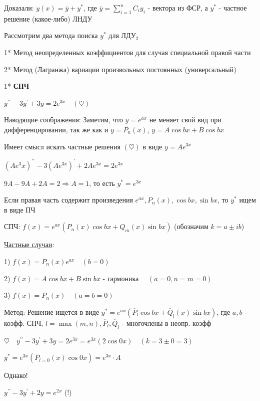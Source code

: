 \documentclass[12pt]{article}
\begin{document}
    Доказали: $y(x) = \overline{y} + y^*$, где $\overline{y} = \sum_{i=1}^n C_i y_i$ - вектора из ФСР, а $y^*$ - частное решение (какое-либо) ЛНДУ

    \Nota Рассмотрим два метода поиска $y^*$ для ЛДУ$_2$

    1* Метод неопределенных коэффициентов для случая специальной правой части

    2* Метод (Лагранжа) вариации произвольных постоянных (универсальный)

    \vspace{10mm}

    1* \textbf{СПЧ}

    \Ex $y^{\prime\prime} - 3y^\prime + 3y = 2e^{3x} \quad (\heartsuit)$

    Наводящие соображения: Заметим, что $y = e^{ax}$ не меняет свой вид при дифференцировании,
    так же как и $y = P_n(x)$, $y = A\cos bx + B\cos bx$

    Имеет смысл искать частные решения $(\heartsuit)$ в виде $y = Ae^{3x}$

    $(Ae^3x)^{\prime\prime} - 3(Ae^{3x})^\prime + 2Ae^{3x} = 2e^{3x}$

    $9A - 9A + 2A = 2 \Longrightarrow A = 1$, то есть $y^* = e^{3x}$

    \Nota Если правая часть содержит произведения $e^{ax}, P_n(x), \cos bx, \sin bx$, то $y^*$ ищем в виде ПЧ

    \Def СПЧ: $f(x) = e^{ax} (P_n(x)\cos bx + Q_m (x)\sin bx)$ (обозначим $k = a \pm ib$)

    \underline{Частные случаи}:

    1) $f(x) = P_n(x) e^{ax} \quad (b = 0)$

    2) $f(x) = A\cos b x + B \sin bx$ - гармоника $\quad (a = 0, n = m = 0)$

    3) $f(x) = P_n(x) \quad (a = b = 0)$

    Метод: Решение ищется в виде $y^* = e^{ax} (\overline{P}_l \cos bx + \overline{Q}_l (x) \sin bx)$,
    где $a, b$ - коэфф. СПЧ, $l = \max(m, n), \overline{P}_l, \overline{Q}_l$ - многочлены в неопр. коэфф

     $\heartsuit \quad y^{\prime\prime} - 3y^\prime + 3y = 2e^{3x} = e^{3x} (2 \cos 0x) \quad (k = 3 \pm 0 = 3)$

    $y^* = e^{3x} (\overline{P}_{l = 0} (x) \cos 0x) = e^{3x} \cdot A$

     Однако!

    $y^{\prime\prime} - 3y^\prime + 2y = e^{2x}$ (!)
\end{document}
